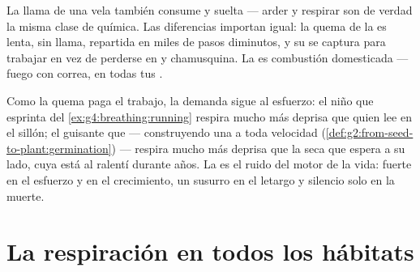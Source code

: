 \begin{example}\label{ex:g7:what-is-respiration:fire}
La llama de una vela también consume  y suelta  --- arder y respirar son de verdad la misma clase de química.
Las diferencias importan igual: la quema de la  es lenta, sin
llama, repartida en miles de pasos diminutos, y su  se captura
para trabajar en vez de perderse en  y chamusquina. La 
es combustión domesticada --- fuego con correa, en todas tus .
\end{example}

\begin{example}\label{ex:g7:what-is-respiration:demand}
Como la quema paga el trabajo, la demanda sigue al esfuerzo: el niño
que esprinta del \cref{ex:g4:breathing:running} respira mucho más
deprisa que quien lee en el sillón; el guisante que  ---
construyendo una  a toda velocidad
(\cref{def:g2:from-seed-to-plant:germination}) --- respira mucho más
deprisa que la  seca que espera a su lado, cuya  está
al ralentí durante años. La  es el ruido del motor de la
vida: fuerte en el esfuerzo y en el crecimiento, un susurro en el
letargo y silencio solo en la muerte.
\end{example}

\section{La respiración en todos los hábitats}

